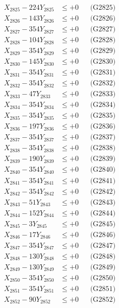 \documentclass[a4paper,10pt]{article}
\begin{document}
{\begin{align}
X_{2825} - 224Y_{2825} &\leq +0 && \text{(G2825)} \\
X_{2826} - 143Y_{2826} &\leq +0 && \text{(G2826)} \\
X_{2827} - 354Y_{2827} &\leq +0 && \text{(G2827)} \\
X_{2828} - 104Y_{2828} &\leq +0 && \text{(G2828)} \\
X_{2829} - 354Y_{2829} &\leq +0 && \text{(G2829)} \\
X_{2830} - 145Y_{2830} &\leq +0 && \text{(G2830)} \\
\allowbreak
X_{2831} - 354Y_{2831} &\leq +0 && \text{(G2831)} \\
X_{2832} - 354Y_{2832} &\leq +0 && \text{(G2832)} \\
X_{2833} - 47Y_{2833} &\leq +0 && \text{(G2833)} \\
X_{2834} - 354Y_{2834} &\leq +0 && \text{(G2834)} \\
X_{2835} - 354Y_{2835} &\leq +0 && \text{(G2835)} \\
X_{2836} - 197Y_{2836} &\leq +0 && \text{(G2836)} \\
X_{2837} - 354Y_{2837} &\leq +0 && \text{(G2837)} \\
X_{2838} - 354Y_{2838} &\leq +0 && \text{(G2838)} \\
X_{2839} - 190Y_{2839} &\leq +0 && \text{(G2839)} \\
X_{2840} - 354Y_{2840} &\leq +0 && \text{(G2840)} \\
\allowbreak
X_{2841} - 354Y_{2841} &\leq +0 && \text{(G2841)} \\
X_{2842} - 354Y_{2842} &\leq +0 && \text{(G2842)} \\
X_{2843} - 51Y_{2843} &\leq +0 && \text{(G2843)} \\
X_{2844} - 152Y_{2844} &\leq +0 && \text{(G2844)} \\
X_{2845} - 3Y_{2845} &\leq +0 && \text{(G2845)} \\
X_{2846} - 17Y_{2846} &\leq +0 && \text{(G2846)} \\
X_{2847} - 354Y_{2847} &\leq +0 && \text{(G2847)} \\
X_{2848} - 130Y_{2848} &\leq +0 && \text{(G2848)} \\
X_{2849} - 130Y_{2849} &\leq +0 && \text{(G2849)} \\
X_{2850} - 354Y_{2850} &\leq +0 && \text{(G2850)} \\
\allowbreak
X_{2851} - 354Y_{2851} &\leq +0 && \text{(G2851)} \\
X_{2852} - 90Y_{2852} &\leq +0 && \text{(G2852)} \\

\end{align}}
\end{document}
